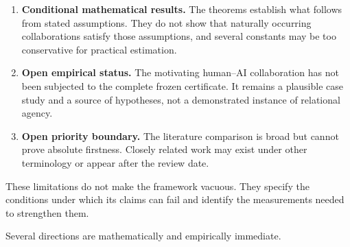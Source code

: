 \begin{enumerate}
\item \textbf{Conditional mathematical results.} The theorems establish what follows from stated
assumptions. They do not show that naturally occurring collaborations satisfy those assumptions, and
several constants may be too conservative for practical estimation.

\item \textbf{Open empirical status.} The motivating human--AI collaboration has not been subjected to
the complete frozen certificate. It remains a plausible case study and a source of hypotheses, not a
demonstrated instance of relational agency.

\item \textbf{Open priority boundary.} The literature comparison is broad but cannot prove absolute
firstness. Closely related work may exist under other terminology or appear after the review date.
\end{enumerate}

These limitations do not make the framework vacuous. They specify the conditions under which its claims
can fail and identify the measurements needed to strengthen them.


Several directions are mathematically and empirically immediate.

